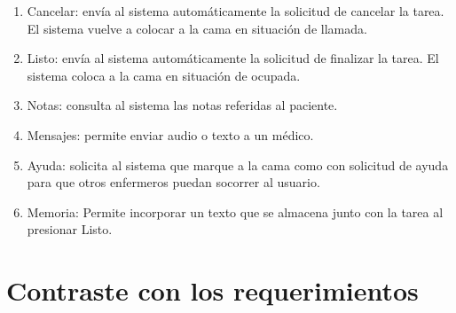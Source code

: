 \begin{enumerate}
\item Cancelar: envía al sistema automáticamente la solicitud de cancelar la tarea. El sistema vuelve a colocar a la cama en situación de llamada.
\item Listo: envía al sistema automáticamente la solicitud de finalizar la tarea. El sistema coloca a la cama en situación de ocupada.
\item Notas: consulta al sistema las notas referidas al paciente. 
\item Mensajes: permite enviar audio o texto a un médico. 
\item Ayuda: solicita al sistema que marque a la cama como con solicitud de ayuda para que otros enfermeros puedan socorrer al usuario. 
\item Memoria: Permite incorporar un texto que se almacena junto con la tarea al presionar Listo.
\end{enumerate}




\pagebreak
\section{Contraste con los requerimientos}

